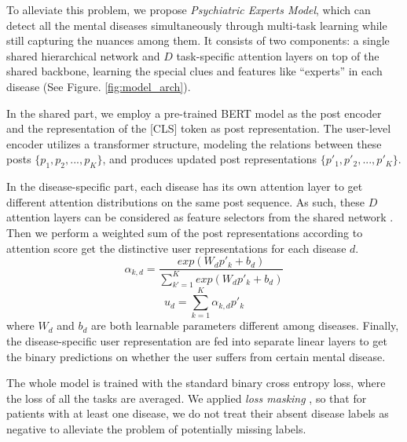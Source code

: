 To alleviate this problem, we propose \textit{Psychiatric Experts Model}, which can detect all the mental diseases simultaneously through multi-task learning while still capturing the nuances among them.
It consists of two components: a single shared hierarchical network and $D$ task-specific attention layers on top of the shared backbone, learning the special clues and features like ``experts'' in each disease (See Figure. \ref{fig:model_arch}). 

In the shared part, we employ a pre-trained BERT model as the post encoder and the representation of the [CLS] token as post representation. The user-level encoder utilizes a transformer structure, modeling the relations between these posts $\{p_1, p_2, ..., p_K\}$, and produces updated post representations $\{p'_1, p'_2, ..., p'_K\}$.

In the disease-specific part, each disease has its own attention layer to get different attention distributions on the same post sequence. 
As such, these $D$ attention layers can be considered as feature selectors from the shared network \citep{Liu2019EndToEndML}. 
Then we perform a weighted sum of the post representations according to attention score get the distinctive user representations for each disease $d$.
\begin{equation}
    \alpha_{k, d} = \frac{exp(W_d p'_k + b_d)}{\sum_{k'=1}^{K} exp(W_d p'_k + b_d)}
\end{equation}
\begin{equation}
    u_d = \sum_{k=1}^K \alpha_{k, d} p'_k
\end{equation}
where $W_d$ and $b_d$ are both learnable parameters different among diseases. 
Finally, the disease-specific user representation are fed into separate linear layers to get the binary predictions on whether the user suffers from certain mental disease. 

The whole model is trained with the standard binary cross entropy loss, where the loss of all the tasks are averaged. We applied \textit{loss masking} \cite{fonseca2020addressing}, so that
for patients with at least one disease, we do not treat their absent disease labels as negative to alleviate the problem of potentially missing labels. 







